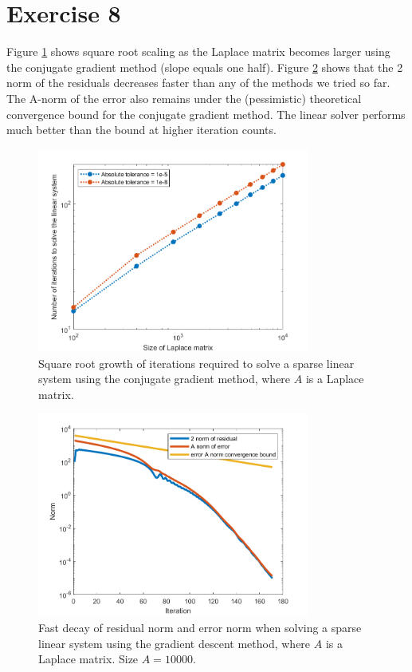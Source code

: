 \documentclass{article}
\begin{document}
\section*{Exercise 8}
Figure \ref{figex8} shows square root scaling as the Laplace matrix becomes larger using the conjugate gradient method (slope equals one half). Figure \ref{figex8norm} shows that the 2 norm of the residuals decreases faster than any of the methods we tried so far. The A-norm of the error also remains under the (pessimistic) theoretical convergence bound for the conjugate gradient method. The linear solver performs much better than the bound at higher iteration counts.
\begin{figure}
	\centering
	\includegraphics[width=0.8\textwidth]{ex8.png}
	\caption{Square root growth of iterations required to solve a sparse linear system using the conjugate gradient method,  where $A$ is a Laplace matrix.}
	\label{figex8}
\end{figure}
\begin{figure}[h]
	\centering
	\includegraphics[width=0.8\textwidth]{ex8_norm.png}
	\caption{Fast decay of residual norm and error norm when solving a sparse linear system using the gradient descent method, where $A$ is a Laplace matrix. Size $A = 10000$.}
	\label{figex8norm}
\end{figure}
\end{document}

